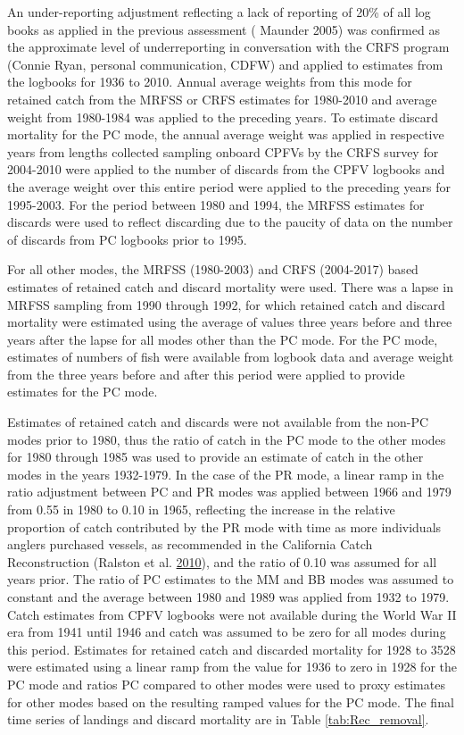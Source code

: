 \documentclass[12pt,]{article}
\begin{document}
An under-reporting adjustment reflecting a lack of reporting of 20\% of
all log books as applied in the previous assessment ( Maunder 2005) was
confirmed as the approximate level of underreporting in conversation
with the CRFS program (Connie Ryan, personal communication, CDFW) and
applied to estimates from the logbooks for 1936 to 2010. Annual average
weights from this mode for retained catch from the MRFSS or CRFS
estimates for 1980-2010 and average weight from 1980-1984 was applied to
the preceding years. To estimate discard mortality for the PC mode, the
annual average weight was applied in respective years from lengths
collected sampling onboard CPFVs by the CRFS survey for 2004-2010 were
applied to the number of discards from the CPFV logbooks and the average
weight over this entire period were applied to the preceding years for
1995-2003. For the period between 1980 and 1994, the MRFSS estimates for
discards were used to reflect discarding due to the paucity of data on
the number of discards from PC logbooks prior to 1995.

For all other modes, the MRFSS (1980-2003) and CRFS (2004-2017) based
estimates of retained catch and discard mortality were used. There was a
lapse in MRFSS sampling from 1990 through 1992, for which retained catch
and discard mortality were estimated using the average of values three
years before and three years after the lapse for all modes other than
the PC mode. For the PC mode, estimates of numbers of fish were
available from logbook data and average weight from the three years
before and after this period were applied to provide estimates for the
PC mode.

Estimates of retained catch and discards were not available from the
non-PC modes prior to 1980, thus the ratio of catch in the PC mode to
the other modes for 1980 through 1985 was used to provide an estimate of
catch in the other modes in the years 1932-1979. In the case of the PR
mode, a linear ramp in the ratio adjustment between PC and PR modes was
applied between 1966 and 1979 from 0.55 in 1980 to 0.10 in 1965,
reflecting the increase in the relative proportion of catch contributed
by the PR mode with time as more individuals anglers purchased vessels,
as recommended in the California Catch Reconstruction (Ralston et al.
\protect\hyperlink{ref-Ralston2010}{2010}), and the ratio of 0.10 was
assumed for all years prior. The ratio of PC estimates to the MM and BB
modes was assumed to constant and the average between 1980 and 1989 was
applied from 1932 to 1979. Catch estimates from CPFV logbooks were not
available during the World War II era from 1941 until 1946 and catch was
assumed to be zero for all modes during this period. Estimates for
retained catch and discarded mortality for 1928 to 3528 were estimated
using a linear ramp from the value for 1936 to zero in 1928 for the PC
mode and ratios PC compared to other modes were used to proxy estimates
for other modes based on the resulting ramped values for the PC mode.
The final time series of landings and discard mortality are in Table
\ref{tab:Rec_removal}.
\end{document}
